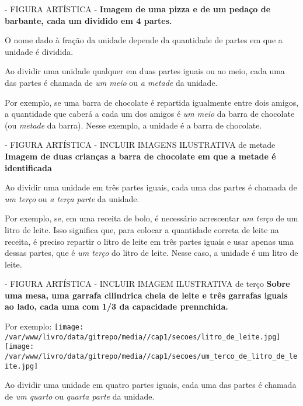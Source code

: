 \documentclass[a4paper,12pt,twoside]{book}
\begin{document}
\begin{imagem*}[breakable]{}{}   - FIGURA ARTÍSTICA -  
  {\bf Imagem de uma pizza e de um pedaço de barbante, cada um dividido em 4 partes.}  
\end{imagem*}

O nome dado à fração da unidade depende da quantidade de partes em que a unidade é dividida. 

Ao dividir uma unidade qualquer em duas partes iguais ou ao meio, cada uma das partes é chamada de {\it um meio} ou {\it a metade} da unidade. 

Por exemplo, se uma barra de chocolate é repartida igualmente entre dois amigos, a quantidade que caberá a cada um dos amigos é {\it um meio} da barra de chocolate (ou {\it metade} da barra). Nesse exemplo, a unidade é a barra de chocolate.

\begin{imagem*}[breakable]{}{}   - FIGURA ARTÍSTICA - INCLUIR IMAGENS ILUSTRATIVA de metade   
  {\bf Imagem de duas crianças a barra de chocolate em que a metade é identificada}  
\end{imagem*}

Ao dividir uma unidade em três partes iguais, cada uma das partes é chamada de {\it um terço} ou {\it a terça parte} da unidade. 

Por exemplo, se, em uma receita de bolo, é necessário acrescentar {\it um terço} de um litro de leite. Isso significa que, para colocar a quantidade correta de leite na receita, é preciso repartir o litro de leite em três partes iguais e usar apenas uma dessas partes, que é {\it um terço} do litro de leite. Nesse caso, a unidade é um litro de leite.

\begin{imagem*}[breakable]{}{}   - FIGURA ARTÍSTICA - INCLUIR IMAGEM ILUSTRATIVA de terço   
  {\bf Sobre uma mesa, uma garrafa cilindrica cheia de leite e três garrafas iguais ao lado, cada uma com 1/3 da capacidade prennchida.}  
  
  Por exemplo:   
    \texttt{[image: /var/www/livro/data/gitrepo/media//cap1/secoes/litro\_de\_leite.jpg]}  
    \texttt{[image: /var/www/livro/data/gitrepo/media//cap1/secoes/um\_terco\_de\_litro\_de\_leite.jpg]}  
  
\end{imagem*}

Ao dividir uma unidade em quatro partes iguais, cada uma das partes é chamada de {\it um quarto} ou {\it quarta parte} da unidade. 
\end{document}
